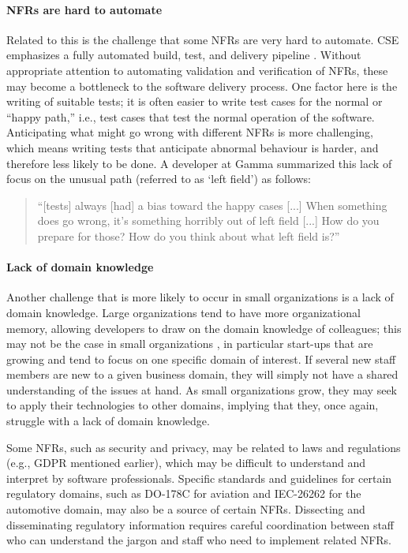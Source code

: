\documentclass[smallextended]{svjour3}
\begin{document}
\paragraph{NFRs are hard to automate} Related to this is the challenge that some NFRs are very hard to automate.  CSE emphasizes a fully automated build, test, and delivery pipeline \citep{fitzgerald2017continuous,fowler-continuous-int,klotins2023continuous}.  
Without appropriate attention to automating validation and verification of NFRs, these may become a bottleneck to the software delivery process.
One factor here is the writing of suitable tests; it is often easier to write test cases for the normal or ``happy path,'' i.e., test cases that test the normal operation of the software. Anticipating what might go wrong with different NFRs is more challenging, which means writing tests that anticipate abnormal behaviour is harder, and therefore less likely to be done. A developer at Gamma summarized this lack of focus on the unusual path (referred to as `left field') as follows:
\begin{quote}
    ``[tests] always [had] a bias toward the happy cases [...] When something does go wrong, it's something horribly out of left field [...] How do you prepare for those? How do you think about what left field is?''
\end{quote}    

\paragraph{Lack of domain knowledge} Another challenge that is more likely to occur in small organizations is a lack of domain knowledge. Large organizations tend to have more organizational memory, allowing developers to draw on the domain knowledge of colleagues; this may not be the case in small organizations \citep{richardson2007guest,sanchez2016understanding}, in particular start-ups that are growing and tend to focus on one specific domain of interest. If several new staff members are new to a given business domain, they will simply not have a shared understanding of the issues at hand.
As small organizations grow, they may seek to apply their technologies to other domains, implying that they, once again, struggle with a lack of domain knowledge. 

Some NFRs, such as security and privacy, may be related to laws and regulations (e.g., GDPR mentioned earlier), which may be difficult to understand and interpret by software professionals. Specific standards and guidelines for certain regulatory domains, such as DO-178C for aviation and IEC-26262 for the automotive domain, may also be a source of certain NFRs.
Dissecting and disseminating regulatory information requires careful coordination between staff who can understand the jargon and staff who need to implement related NFRs. 
\end{document}
